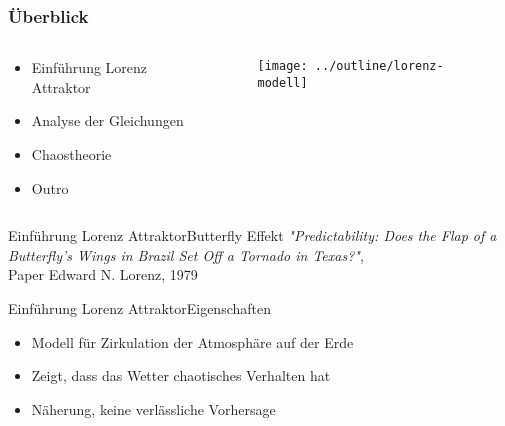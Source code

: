 \documentclass[presentation.tex]{subfiles}
\begin{document}
	\frame{\titlepage}
    
    \begin{frame}
        \frametitle{Überblick}
        \begin{columns}
        	\begin{column}{0.6\linewidth}
        		\begin{itemize}
        			\item Einführung Lorenz Attraktor
        			\item Analyse der Gleichungen
        			\item Chaostheorie
        			\item Outro
        		\end{itemize}
        	\end{column}
        	\begin{column}{0.4\linewidth}
        		\begin{figure}
				\centering
				\texttt{[image: ../outline/lorenz-modell]}
				\label{fig:lorenz-modell}
				\end{figure}
        	\end{column}
        \end{columns}
    \end{frame}
    
    \begin{frame}{Einführung Lorenz Attraktor}{Butterfly Effekt}
		\textit{"Predictability: Does the Flap of a Butterfly's Wings in Brazil Set Off a Tornado in Texas?"}, \\
		Paper Edward N. Lorenz, 1979
    \end{frame}
    
    \begin{frame}{Einführung Lorenz Attraktor}{Eigenschaften}
    	\begin{itemize}
    		\item Modell für Zirkulation der Atmosphäre auf der Erde
    		\item Zeigt, dass das Wetter chaotisches Verhalten hat
    		\item Näherung, keine verlässliche Vorhersage
    	\end{itemize}
    \end{frame}
    
\end{document}
